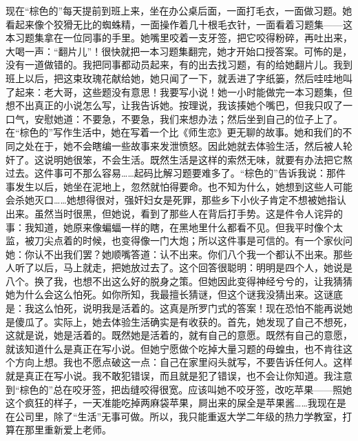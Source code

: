 现在“棕色的”每天提前到班上来，坐在办公桌后面，一面打毛衣，一面做习题。她看起来像个狡猾无比的蜘蛛精，一面操作着几十根毛衣针，一面看着习题集——这本习题集拿在一位同事的手里。她嘴里咬着一支牙签，把它咬得粉碎，再吐出来，大喝一声：“翻片儿”！很快就把一本习题集翻完，她才开始口授答案。可怖的是，没有一道做错的。我把同事都动员起来，有的出去找习题，有的给她翻片儿。我到班上以后，把这束玫瑰花献给她，她只闻了一下，就丢进了字纸篓，然后哇哇地叫了起来：老大哥，这些题没有意思！我要写小说！她一小时能做完一本习题集，但想不出真正的小说怎么写，让我告诉她。按理说，我该揍她个嘴巴，但我只叹了一口气，安慰她道：不要急，不要急，我们来想办法；然后坐到自己的位子上了。 在“棕色的”写作生活中，她在写着一个比《师生恋》更无聊的故事。她和我们的不同之处在于，她不会瞎编一些故事来发泄愤怒。因此她就去体验生活，然后被人轮奸了。这说明她很笨，不会生活。既然生活是这样的索然无味，就要有办法把它熬过去。这件事可不那么容易……起码比解习题要难多了。“棕色的”告诉我说：那件事发生以后，她坐在泥地上，忽然就怕得要命。也不知为什么，她想到这些人可能会杀她灭口……她想得很对，强奸妇女是死罪，那些乡下小伙子肯定不想被她指认出来。虽然当时很黑，但她说，看到了那些人在背后打手势。这是件令人诧异的事：我知道，她原来像蝙蝠一样的瞎，在黑地里什么都看不见。但我平时像个太监，被刀尖点着的时候，也变得像一门大炮；所以这件事是可信的。有一个家伙问她：你认不出我们罢？她顺嘴答道：认不出来。你们八个我一个都认不出来。那些人听了以后，马上就走，把她放过去了。这个回答很聪明：明明是四个人，她说是八个。换了我，也想不出这么好的脱身之策。但她因此变得神经兮兮的，让我猜猜她为什么会这么怕死。如你所知，我最擅长猜谜，但这个谜我没猜出来。这谜底是：我这么怕死，说明我是活着的。这真是所罗门式的答案！现在恐怕不能再说她是傻瓜了。实际上，她去体验生活确实是有收获的。首先，她发现了自己不想死，这就是说，她是活着的。既然她是活着的，就有自己的意愿。既然有自己的意愿，就该知道什么是真正在写小说。但她宁愿做个吃掉大量习题的母蝗虫，也不肯往这个方向上想。我也不愿点破这一点：自己在家里闷头就写，不要告诉任何人。这样就是真正在写小说。我不敢犯错误，而且就是犯了错误，也不会让你知道。我注意到“棕色的”总在咬牙签，把齿缝咬得很宽。应该叫她不咬牙签，改吃苹果——照她这个疯狂的样子，一天准能吃掉两麻袋苹果，屙出来的屎全是苹果酱……我现在是在公司里，除了“生活”无事可做。所以，我只能重返大学二年级的热力学教室，打算在那里重新爱上老师。
